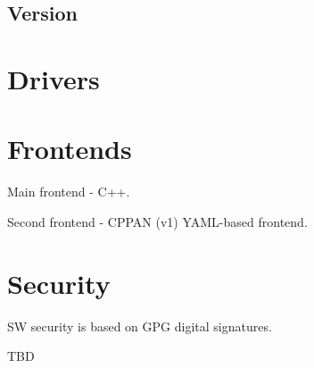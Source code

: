\subsection{Version}


\section{Drivers}

\section{Frontends}

Main frontend - C++.

Second frontend - CPPAN (v1) YAML-based frontend.

\section{Security}

SW security is based on GPG digital signatures.

TBD
